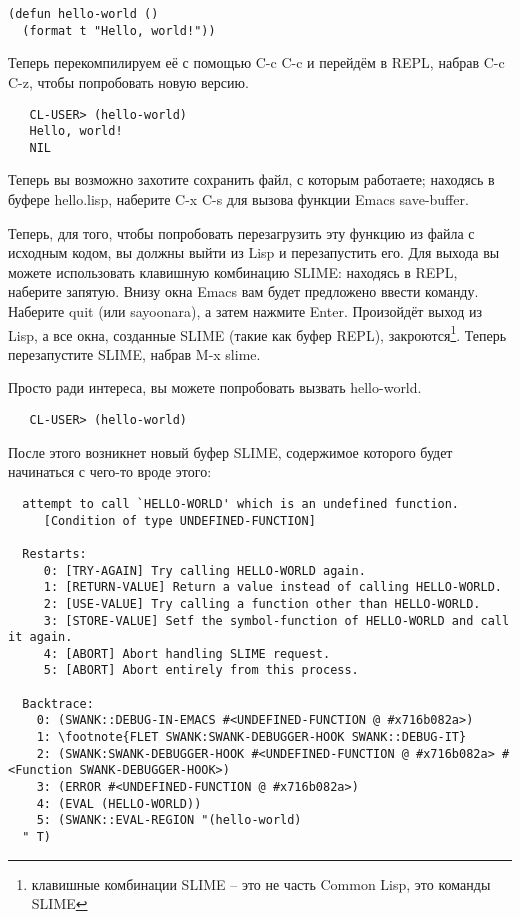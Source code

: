 \begin{lstlisting}
(defun hello-world ()
  (format t "Hello, world!"))
\end{lstlisting}

Теперь перекомпилируем её с помощью C-c C-c и перейдём в REPL, набрав C-c C-z, чтобы
попробовать новую версию.

\begin{verbatim}
   CL-USER> (hello-world)
   Hello, world!
   NIL
\end{verbatim}

Теперь вы возможно захотите сохранить файл, с которым работаете; находясь в буфере
hello.lisp, наберите C-x C-s для вызова функции Emacs save-buffer.

Теперь, для того, чтобы попробовать перезагрузить эту функцию из файла с исходным кодом,
вы должны выйти из Lisp и перезапустить его. Для выхода вы можете использовать клавишную
комбинацию SLIME: находясь в REPL, наберите запятую. Внизу окна Emacs вам будет предложено
ввести команду. Наберите quit (или sayoonara), а затем нажмите Enter. Произойдёт выход из
Lisp, а все окна, созданные SLIME (такие как буфер REPL), закроются\footnote{клавишные
  комбинации SLIME -- это не часть Common Lisp, это команды SLIME}. Теперь перезапустите
SLIME, набрав M-x slime.

Просто ради интереса, вы можете попробовать вызвать hello-world.

\begin{verbatim}
   CL-USER> (hello-world)
\end{verbatim}

После этого возникнет новый буфер SLIME, содержимое которого будет начинаться с чего-то
вроде этого:

\begin{verbatim}
  attempt to call `HELLO-WORLD' which is an undefined function.
     [Condition of type UNDEFINED-FUNCTION]
  
  Restarts:
     0: [TRY-AGAIN] Try calling HELLO-WORLD again.
     1: [RETURN-VALUE] Return a value instead of calling HELLO-WORLD.
     2: [USE-VALUE] Try calling a function other than HELLO-WORLD.
     3: [STORE-VALUE] Setf the symbol-function of HELLO-WORLD and call it again.
     4: [ABORT] Abort handling SLIME request.
     5: [ABORT] Abort entirely from this process.
  
  Backtrace:
    0: (SWANK::DEBUG-IN-EMACS #<UNDEFINED-FUNCTION @ #x716b082a>)
    1: \footnote{FLET SWANK:SWANK-DEBUGGER-HOOK SWANK::DEBUG-IT}
    2: (SWANK:SWANK-DEBUGGER-HOOK #<UNDEFINED-FUNCTION @ #x716b082a> #<Function SWANK-DEBUGGER-HOOK>)
    3: (ERROR #<UNDEFINED-FUNCTION @ #x716b082a>)
    4: (EVAL (HELLO-WORLD))
    5: (SWANK::EVAL-REGION "(hello-world)
  " T)
\end{verbatim}

